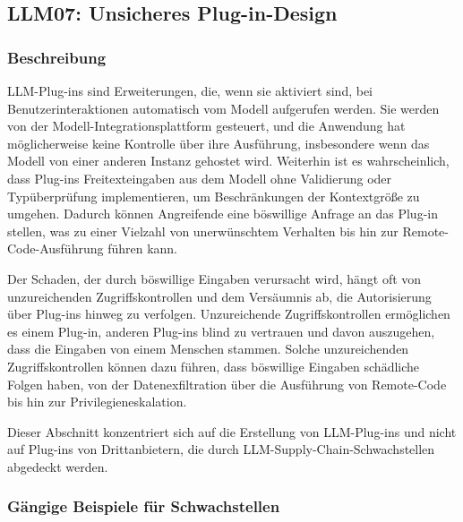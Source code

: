 \documentclass[
]{article}
\author{}
\date{}
\begin{document}
\subsection{LLM07: Unsicheres
Plug-in-Design}\label{llm07-unsicheres-plug-in-design}

\subsubsection{Beschreibung}\label{beschreibung}

LLM-Plug-ins sind Erweiterungen, die, wenn sie aktiviert sind, bei
Benutzerinteraktionen automatisch vom Modell aufgerufen werden. Sie
werden von der Modell-Integrationsplattform gesteuert, und die Anwendung
hat möglicherweise keine Kontrolle über ihre Ausführung, insbesondere
wenn das Modell von einer anderen Instanz gehostet wird. Weiterhin ist
es wahrscheinlich, dass Plug-ins Freitexteingaben aus dem Modell ohne
Validierung oder Typüberprüfung implementieren, um Beschränkungen der
Kontextgröße zu umgehen. Dadurch können Angreifende eine böswillige
Anfrage an das Plug-in stellen, was zu einer Vielzahl von unerwünschtem
Verhalten bis hin zur Remote-Code-Ausführung führen kann.

Der Schaden, der durch böswillige Eingaben verursacht wird, hängt oft
von unzureichenden Zugriffskontrollen und dem Versäumnis ab, die
Autorisierung über Plug-ins hinweg zu verfolgen. Unzureichende
Zugriffskontrollen ermöglichen es einem Plug-in, anderen Plug-ins blind
zu vertrauen und davon auszugehen, dass die Eingaben von einem Menschen
stammen. Solche unzureichenden Zugriffskontrollen können dazu führen,
dass böswillige Eingaben schädliche Folgen haben, von der
Datenexfiltration über die Ausführung von Remote-Code bis hin zur
Privilegieneskalation.

Dieser Abschnitt konzentriert sich auf die Erstellung von LLM-Plug-ins
und nicht auf Plug-ins von Drittanbietern, die durch
LLM-Supply-Chain-Schwachstellen abgedeckt werden.

\subsubsection{Gängige Beispiele für
Schwachstellen}\label{guxe4ngige-beispiele-fuxfcr-schwachstellen}
\end{document}
